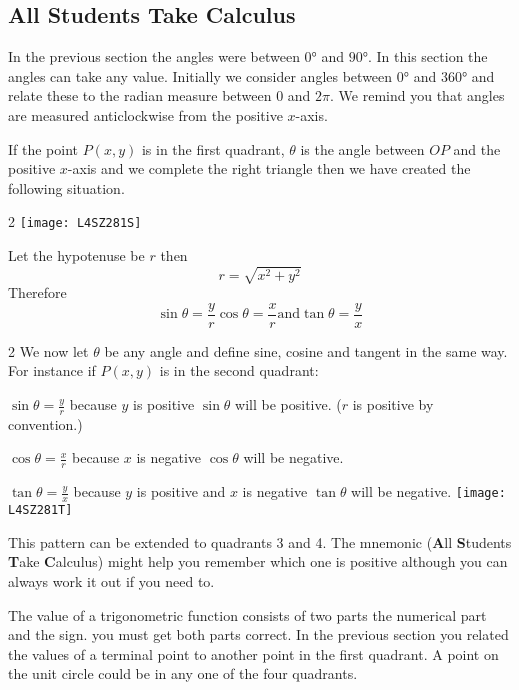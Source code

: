 \subsection*{All Students Take Calculus}
In the previous section the angles were between $\ang{0} $ and $\ang{90} $. In this section the angles can take any value. Initially we consider angles between $\ang{0} $ and $\ang{360} $ and relate these to the radian measure between $0$ and $2 \pi $. We remind you that angles are measured anticlockwise from the positive $x$-axis. 

If the point $P (x ,y)$ is in the first quadrant, $\theta $ is the angle between $OP$ and the positive $x$-axis and we complete the right triangle then we have created the following situation.  

\begin {multicols}{2}
\texttt{[image: L4SZ281S]}

Let the hypotenuse be $r$ then
\begin{equation*}r =\sqrt{x^{2} +y^{2}}
\end{equation*}
Therefore
\begin{equation*}\sin  \theta  =\frac{y}{r}\text{}\cos  \theta  =\frac{x}{r}\text{and}\tan  \theta  =\frac{y}{x}
\end{equation*}
\end {multicols}
\begin {multicols}{2}
We now let $\theta $ be any angle and define sine, cosine and tangent in the same way. For instance
if $P (x ,y)$ is in the second quadrant:    

$\sin  \theta  =\frac{y}{r}$ because $y$ is positive $\sin  \theta $ will be positive. ($r$ is positive by convention.) 

$\cos  \theta  =\frac{x}{r}$ because $x$ is negative $\cos  \theta $ will be negative. 

$\tan  \theta  =\frac{y}{x}$ because $y$ is positive and $x$ is negative $\tan  \theta $ will be negative. 
\texttt{[image: L4SZ281T]}
\end{multicols}
This pattern can be extended to quadrants 3 and 4. The mnemonic (\textbf{A}ll \textbf{S}tudents \textbf{T}ake \textbf{C}alculus) might help you remember which one is positive although you can always work it out if you need to. 

The value of a trigonometric function consists of two parts the numerical part and the sign. you must get both parts correct. In the previous section you related the values of a terminal point to another point in the first quadrant. A point on the unit circle could be in any one of the four quadrants. 

